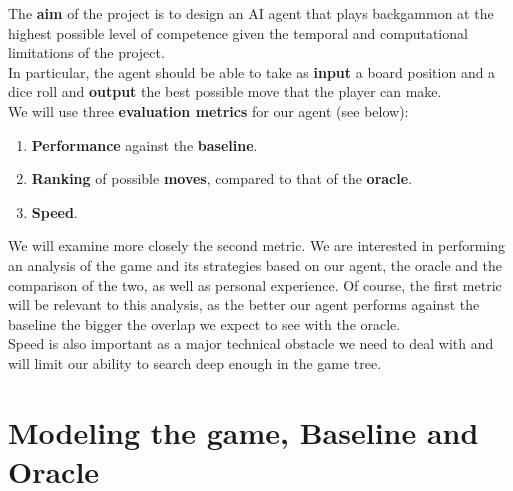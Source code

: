 \documentclass[11pt, a4paper, twoside]{amsart} %
\theoremstyle{definition}
\begin{document}
The \textbf{aim} of the project is to design an AI agent that plays backgammon at the highest possible level of competence given the temporal and computational limitations of the project.\\
In particular, the agent should be able to take as \textbf{input} a board position and a dice roll and \textbf{output} the best possible move that the player can make.\\
We will use three \textbf{evaluation metrics} for our agent (see below):
\begin{enumerate}
\item \textbf{Performance} against the \textbf{baseline}.
\item \textbf{Ranking} of possible \textbf{moves}, compared to that of the \textbf{oracle}.
\item \textbf{Speed}.
\end{enumerate}
We will examine more closely the second metric. We are interested in performing an analysis of the game and its strategies based on our agent, the oracle and the comparison of the two, as well as personal experience. Of course, the first metric will be relevant to this analysis, as the better our agent performs against the baseline the bigger the overlap we expect to see with the oracle.\\
Speed is also important as a major technical obstacle we need to deal with and will limit our ability to search deep enough in the game tree.

\section{Modeling the game, Baseline and Oracle}
\end{document}
